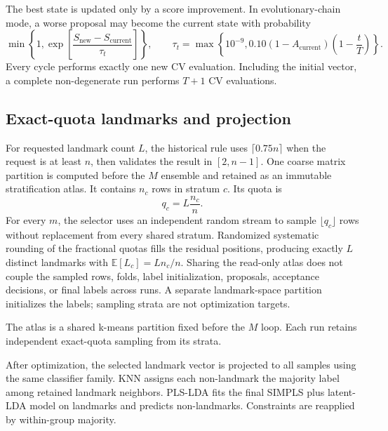 \documentclass[twoside,11pt]{article}
\begin{document}
The best state is updated only by a score improvement. In evolutionary-chain mode, a worse proposal may become the current state with probability
\begin{equation}
\min\left\{1,\exp\left[\frac{S_{\mathrm{new}}-S_{\mathrm{current}}}{\tau_t}\right]\right\},
\qquad
\tau_t=\max\left\{10^{-9},0.10(1-A_{\mathrm{current}})\left(1-\frac{t}{T}\right)\right\}.
\end{equation}
Every cycle performs exactly one new CV evaluation. Including the initial vector, a complete non-degenerate run performs $T+1$ CV evaluations.

\subsection{Exact-quota landmarks and projection}
For requested landmark count $L$, the historical rule uses $\lceil0.75n\rceil$ when the request is at least $n$, then validates the result in $[2,n-1]$. One coarse matrix partition is computed before the $M$ ensemble and retained as an immutable stratification atlas. It contains $n_c$ rows in stratum $c$. Its quota is
\begin{equation}
q_c=L\frac{n_c}{n}.
\end{equation}
For every $m$, the selector uses an independent random stream to sample $\lfloor q_c\rfloor$ rows without replacement from every shared stratum. Randomized systematic rounding of the fractional quotas fills the residual positions, producing exactly $L$ distinct landmarks with $\mathbb{E}[L_c]=Ln_c/n$. Sharing the read-only atlas does not couple the sampled rows, folds, label initialization, proposals, acceptance decisions, or final labels across runs. A separate landmark-space partition initializes the labels; sampling strata are not optimization targets.

The atlas is a shared k-means partition fixed before the $M$ loop. Each run retains independent exact-quota sampling from its strata.

After optimization, the selected landmark vector is projected to all samples using the same classifier family. KNN assigns each non-landmark the majority label among retained landmark neighbors. PLS-LDA fits the final SIMPLS plus latent-LDA model on landmarks and predicts non-landmarks. Constraints are reapplied by within-group majority.
\end{document}
